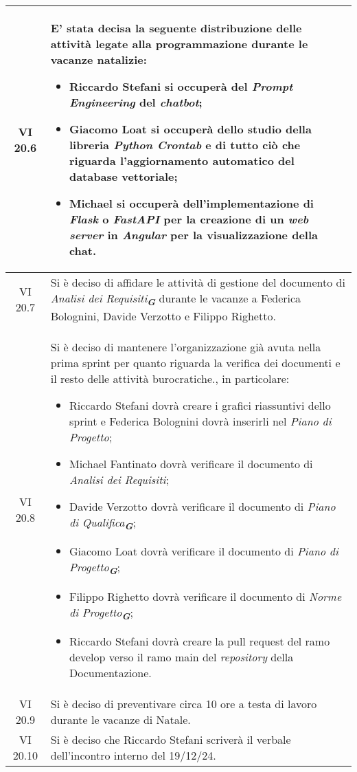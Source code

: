 \begin{table}[htbp]
\begin{tabular}{|c|p{}|}
        \hline
        VI 20.6 & E' stata decisa la seguente distribuzione delle attività legate alla programmazione durante le vacanze natalizie:
        \begin{itemize}
            \item Riccardo Stefani si occuperà del \emph{Prompt Engineering} del \emph{chatbot};
            \item Giacomo Loat si occuperà dello studio della libreria \emph{Python Crontab} e di tutto ciò che riguarda l'aggiornamento automatico del database vettoriale;
            \item Michael si occuperà dell'implementazione di \emph{Flask} o \emph{FastAPI} per la creazione di un \emph{web server} in \emph{Angular} per la visualizzazione della chat.
        \end{itemize}\\
        \hline
        VI 20.7 & Si è deciso di affidare le attività di gestione del documento di \emph{Analisi dei Requisiti}\textsubscript{\textit{\textbf{G}}} durante le vacanze a 
        Federica Bolognini, Davide Verzotto e Filippo Righetto.\\
        \hline
        VI 20.8 & Si è deciso di mantenere l'organizzazione già avuta nella prima sprint per quanto riguarda la verifica dei documenti e il resto delle attività burocratiche.,
        in particolare:
        \begin{itemize}
            \item Riccardo Stefani dovrà creare i grafici riassuntivi dello sprint e Federica Bolognini dovrà inserirli nel \emph{Piano di Progetto};
            \item Michael Fantinato dovrà verificare il documento di \emph{Analisi dei Requisiti};
            \item Davide Verzotto dovrà verificare il documento di \emph{Piano di Qualifica}\textsubscript{\textit{\textbf{G}}};
            \item Giacomo Loat dovrà verificare il documento di \emph{Piano di Progetto}\textsubscript{\textit{\textbf{G}}};
            \item Filippo Righetto dovrà verificare il documento di \emph{Norme di Progetto}\textsubscript{\textit{\textbf{G}}};
            \item Riccardo Stefani dovrà creare la pull request del ramo develop verso il ramo main del \emph{repository} della Documentazione.
        \end{itemize}\\
        \hline
        VI 20.9 & Si è deciso di preventivare circa 10 ore a testa di lavoro durante le vacanze di Natale. \\
        \hline
        VI 20.10 & Si è deciso che Riccardo Stefani scriverà il verbale dell'incontro interno del 19/12/24. \\
        \hline
    \end{tabular}
\end{table}
